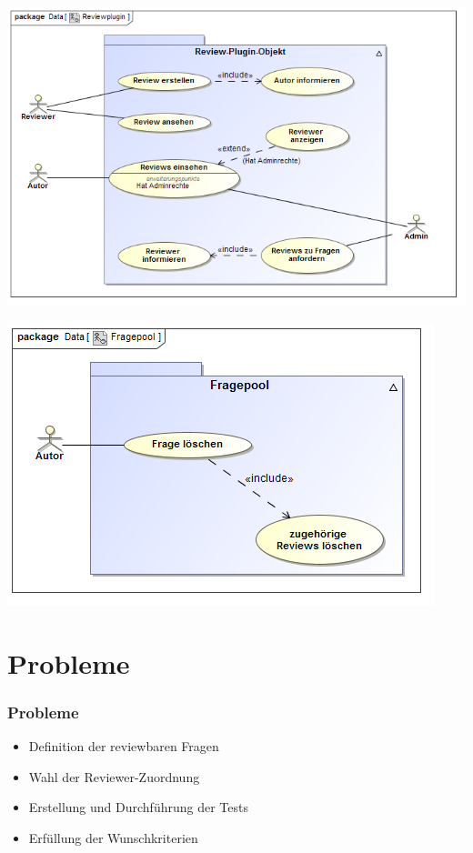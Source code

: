 \documentclass{beamer}
\begin{document}
		\begin{frame}
			\begin{center}
				\includegraphics[scale=0.45]{Diagramme/Use_Case_Diagram__Reviewplugin.png}
				\label{Reviewplugin}
			\end{center}
		\end{frame}
		\begin{frame}
			\begin{center}
				\includegraphics[scale=0.5]{Diagramme/Use_Case_Diagram__Fragepool.png}
				\label{Fragepool}
			\end{center}
		\end{frame}
	\section{Probleme}
		\begin{frame}
			\frametitle{Probleme}
    		\begin{itemize}
		    	\item Definition der reviewbaren Fragen
		    	\pause
    			\item Wahl der Reviewer-Zuordnung
    			\pause
    			\item Erstellung und Durchführung der Tests
    			\pause
    			\item Erfüllung der Wunschkriterien
    		\end{itemize}
		\end{frame}
\end{document}
